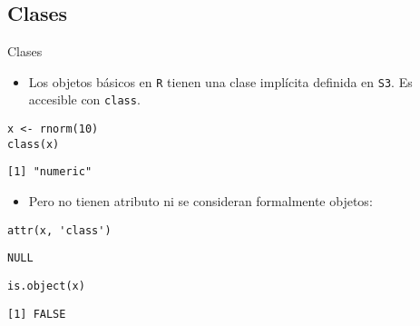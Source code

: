\documentclass[xcolor={usenames,svgnames,dvipsnames}]{beamer}
\begin{document}
\subsection{Clases}
\label{sec-2-1}
\begin{frame}[fragile,label=sec-2-1-1]{Clases}
 \begin{itemize}
\item Los objetos básicos en \texttt{R} tienen una clase implícita definida en \texttt{S3}. Es accesible con \texttt{class}.
\end{itemize}
\lstset{language=R,numbers=none}
\begin{lstlisting}
x <- rnorm(10)
class(x)
\end{lstlisting}

\begin{verbatim}
[1] "numeric"
\end{verbatim}

\begin{itemize}
\item Pero no tienen atributo ni se consideran formalmente objetos:
\end{itemize}
\lstset{language=R,numbers=none}
\begin{lstlisting}
attr(x, 'class')
\end{lstlisting}

\begin{verbatim}
NULL
\end{verbatim}

\lstset{language=R,numbers=none}
\begin{lstlisting}
is.object(x)
\end{lstlisting}

\begin{verbatim}
[1] FALSE
\end{verbatim}
\end{frame}
\end{document}
